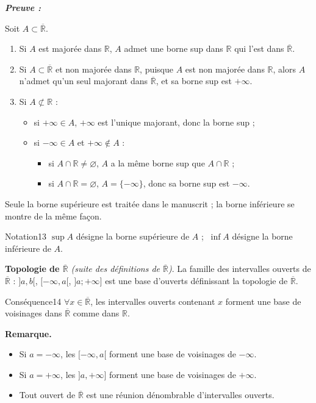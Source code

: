 \documentclass[11pt,a4paper]{article}
\newcommand{\R}{\mathbb{R}}
\newcommand{\Rb}{\overline{\mathbb{R}}}
\newenvironment{preuve}{\par\textit{\textbf{Preuve :}}\par\nopagebreak[4]}{\par}
\begin{document}
\begin{preuve}\end{preuve}
Soit $A\subset\Rb$.
\begin{enumerate}[label=\textbf{\arabic*-},leftmargin=1.2cm]
  \item Si $A$ est majorée dans $\R$, $A$ admet une borne sup dans $\R$ qui l'est dans $\Rb$.
  \item Si $A\subset\Rb$ et non majorée dans $\R$, puisque $A$ est non majorée dans $\R$, alors $A$ n'admet qu'un seul
        majorant dans $\Rb$, et sa borne sup est $+\infty$.
  \item Si $A\not\subset\R$ :
  \begin{itemize}[leftmargin=0.8cm]
    \item si $+\infty\in A$, $+\infty$ est l'unique majorant, donc la borne sup ;
    \item si $-\infty\in A$ et $+\infty\notin A$ :
    \begin{itemize}[leftmargin=0.8cm]
      \item si $A\cap\R\neq\varnothing$, $A$ a la même borne sup que $A\cap\R$ ;
      \item si $A\cap\R=\varnothing$, $A=\{-\infty\}$, donc sa borne sup est $-\infty$.
    \end{itemize}
  \end{itemize}
\end{enumerate}



\begin{note}
Seule la borne supérieure est traitée dans le manuscrit ; la borne inférieure se montre de la même façon.
\end{note}

\begin{enonce}{Notation}{13}
$\sup A$ désigne la borne supérieure de $A$ ; $\ \inf A$ désigne la borne inférieure de $A$.
\end{enonce}

\textbf{Topologie de $\Rb$} \textit{(suite des définitions de $\Rb$)}.
La famille des intervalles ouverts de $\Rb$ : $]a,b[$, $[-\infty,a[$, $]a;+\infty]$ est une base d'ouverts
définissant la topologie de $\Rb$.

\begin{enonce}{Conséquence}{14}
$\forall x\in\Rb$, les intervalles ouverts contenant $x$ forment une base de voisinages dans $\Rb$
comme dans $\R$.
\end{enonce}

\textbf{\color{bleu}Remarque.}
\begin{itemize}[leftmargin=1.2cm]
  \item Si $a=-\infty$, les $[-\infty,a[$ forment une base de voisinages de $-\infty$.
  \item Si $a=+\infty$, les $]a,+\infty]$ forment une base de voisinages de $+\infty$.
  \item Tout ouvert de $\Rb$ est une réunion dénombrable d'intervalles ouverts.
\end{itemize}
\end{document}

